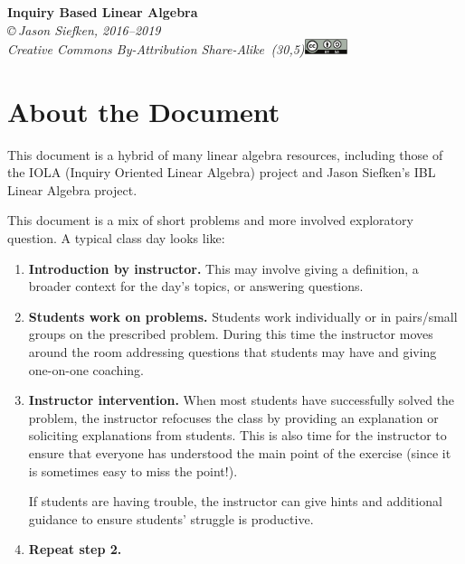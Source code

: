 \documentclass{problemset}
\begin{document}









\pagestyle{empty}



\newpage



\begin{center}
{\huge\bf Inquiry Based Linear Algebra}\\

\vspace{.7in}
{
\it \copyright\,Jason Siefken, 2016--2019 \\
Creative Commons By-Attribution Share-Alike\, \makebox(30,5){\includegraphics[height=1.2em]{by-sa.pdf}}
}
\end{center}

\section*{About the Document}

This document is a hybrid of many linear algebra resources, including those of
the IOLA (Inquiry Oriented Linear Algebra) project and Jason Siefken's
IBL Linear Algebra project.

This document is a mix of short problems and more involved exploratory question. A typical
class day looks like:
\begin{enumerate}
	\item {\bf Introduction by instructor.} This may involve giving a definition,
		a broader context for the day's topics, or answering questions.

	\item {\bf Students work on problems.} Students work individually or in pairs/small groups
		on the prescribed problem. During this time the instructor moves
		around the room addressing questions that students may have and giving
		one-on-one coaching.

	\item {\bf Instructor intervention.} When most students have successfully solved
		the problem, the instructor refocuses the class by providing an
		explanation or soliciting explanations from students.
		This is also time for the instructor to ensure that everyone has
		understood the main point of the exercise (since it is sometimes
		easy to miss the point!).

		If students are having trouble, the instructor can give hints
		and additional guidance to ensure students' struggle is productive.

	\item {\bf Repeat step 2.}
\end{enumerate}
\end{document}
